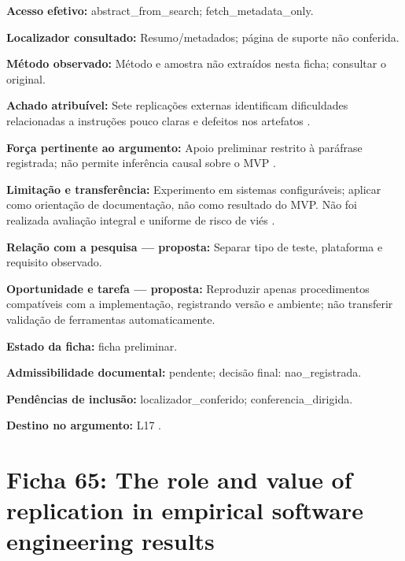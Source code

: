 \noindent\textbf{Acesso efetivo:} abstract\_from\_search; fetch\_metadata\_only.\par\medskip

\noindent\textbf{Localizador consultado:} Resumo/metadados; página de suporte não conferida.\par\medskip

\noindent\textbf{Método observado:} Método e amostra não extraídos nesta ficha; consultar o original.\par\medskip

\noindent\textbf{Achado atribuível:} Sete replicações externas identificam dificuldades relacionadas a instruções pouco claras e defeitos nos artefatos \citep{eng12}.\par\medskip

\noindent\textbf{Força pertinente ao argumento:} Apoio preliminar restrito à paráfrase registrada; não permite inferência causal sobre o MVP \citep{eng12}.\par\medskip

\noindent\textbf{Limitação e transferência:} Experimento em sistemas configuráveis; aplicar como orientação de documentação, não como resultado do MVP. Não foi realizada avaliação integral e uniforme de risco de viés \citep{eng12}.\par\medskip

\noindent\textbf{Relação com a pesquisa — proposta:} Separar tipo de teste, plataforma e requisito observado.\par\medskip

\noindent\textbf{Oportunidade e tarefa — proposta:} Reproduzir apenas procedimentos compatíveis com a implementação, registrando versão e ambiente; não transferir validação de ferramentas automaticamente.\par\medskip

\noindent\textbf{Estado da ficha:} ficha preliminar.\par\medskip

\noindent\textbf{Admissibilidade documental:} pendente; decisão final: nao\_registrada.\par\medskip

\noindent\textbf{Pendências de inclusão:} localizador\_conferido; conferencia\_dirigida.\par\medskip

\noindent\textbf{Destino no argumento:} L17 .

\clearpage\section*{Ficha 65: The role and value of replication in empirical software engineering results}

